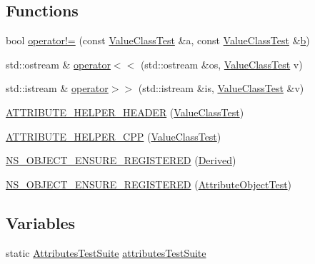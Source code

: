 \subsection*{Functions}
\begin{DoxyCompactItemize}
\item 
bool \hyperlink{attribute-test-suite_8cc_afa4c77186a2018627e5723f27b32fa1a}{operator!=} (const \hyperlink{classValueClassTest}{Value\+Class\+Test} \&a, const \hyperlink{classValueClassTest}{Value\+Class\+Test} \&\hyperlink{lte__pathloss_8m_a21ad0bd836b90d08f4cf640b4c298e7c}{b})
\item 
std\+::ostream \& \hyperlink{attribute-test-suite_8cc_a9bd7ff4dd3ed9254f4be6b7c053f8e31}{operator$<$$<$} (std\+::ostream \&os, \hyperlink{classValueClassTest}{Value\+Class\+Test} v)
\item 
std\+::istream \& \hyperlink{attribute-test-suite_8cc_a65991880e98949b40ceb1e97e1d63f07}{operator$>$$>$} (std\+::istream \&is, \hyperlink{classValueClassTest}{Value\+Class\+Test} \&v)
\item 
\hyperlink{attribute-test-suite_8cc_a244b599262a607c5916e08ca3fad472d}{A\+T\+T\+R\+I\+B\+U\+T\+E\+\_\+\+H\+E\+L\+P\+E\+R\+\_\+\+H\+E\+A\+D\+ER} (\hyperlink{classValueClassTest}{Value\+Class\+Test})
\item 
\hyperlink{attribute-test-suite_8cc_aa12f2d40da8dab7d8ab128bf590600ee}{A\+T\+T\+R\+I\+B\+U\+T\+E\+\_\+\+H\+E\+L\+P\+E\+R\+\_\+\+C\+PP} (\hyperlink{classValueClassTest}{Value\+Class\+Test})
\item 
\hyperlink{attribute-test-suite_8cc_ae8ee084a23317983fc096ee2c39c122f}{N\+S\+\_\+\+O\+B\+J\+E\+C\+T\+\_\+\+E\+N\+S\+U\+R\+E\+\_\+\+R\+E\+G\+I\+S\+T\+E\+R\+ED} (\hyperlink{classDerived}{Derived})
\item 
\hyperlink{attribute-test-suite_8cc_ac7198c05f1e373ab6edb506d39ff364c}{N\+S\+\_\+\+O\+B\+J\+E\+C\+T\+\_\+\+E\+N\+S\+U\+R\+E\+\_\+\+R\+E\+G\+I\+S\+T\+E\+R\+ED} (\hyperlink{classAttributeObjectTest}{Attribute\+Object\+Test})
\end{DoxyCompactItemize}
\subsection*{Variables}
\begin{DoxyCompactItemize}
\item 
static \hyperlink{classAttributesTestSuite}{Attributes\+Test\+Suite} \hyperlink{attribute-test-suite_8cc_ae19fbe9589d85c1741f99fe8c8b7e8af}{attributes\+Test\+Suite}
\end{DoxyCompactItemize}


